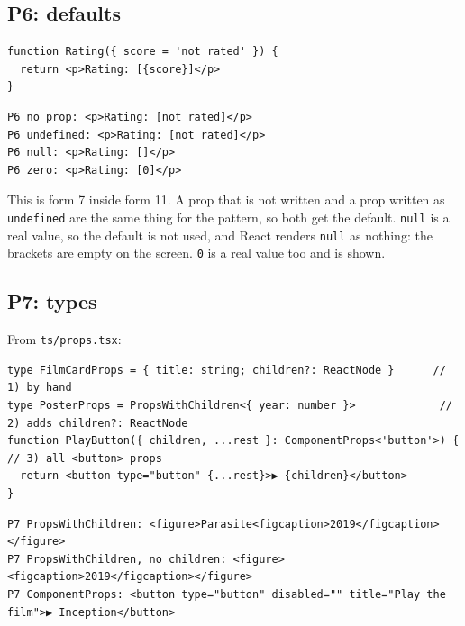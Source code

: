 \documentclass[
]{article}
\newcommand{\passthrough}[1]{#1}
\begin{document}
\hypertarget{p6-defaults}{%
\subsection{P6: defaults}\label{p6-defaults}}

\begin{lstlisting}
function Rating({ score = 'not rated' }) {
  return <p>Rating: [{score}]</p>
}
\end{lstlisting}

\begin{lstlisting}
P6 no prop: <p>Rating: [not rated]</p>
P6 undefined: <p>Rating: [not rated]</p>
P6 null: <p>Rating: []</p>
P6 zero: <p>Rating: [0]</p>
\end{lstlisting}

This is form 7 inside form 11. A prop that is not written and a prop
written as \passthrough{\lstinline!undefined!} are the same thing for
the pattern, so both get the default. \passthrough{\lstinline!null!} is
a real value, so the default is not used, and React renders
\passthrough{\lstinline!null!} as nothing: the brackets are empty on the
screen. \passthrough{\lstinline!0!} is a real value too and is shown.

\hypertarget{p7-types}{%
\subsection{P7: types}\label{p7-types}}

From \passthrough{\lstinline!ts/props.tsx!}:

\begin{lstlisting}
type FilmCardProps = { title: string; children?: ReactNode }      // 1) by hand
type PosterProps = PropsWithChildren<{ year: number }>             // 2) adds children?: ReactNode
function PlayButton({ children, ...rest }: ComponentProps<'button'>) {  // 3) all <button> props
  return <button type="button" {...rest}>▶ {children}</button>
}
\end{lstlisting}

\begin{lstlisting}
P7 PropsWithChildren: <figure>Parasite<figcaption>2019</figcaption></figure>
P7 PropsWithChildren, no children: <figure><figcaption>2019</figcaption></figure>
P7 ComponentProps: <button type="button" disabled="" title="Play the film">▶ Inception</button>
\end{lstlisting}
\end{document}
